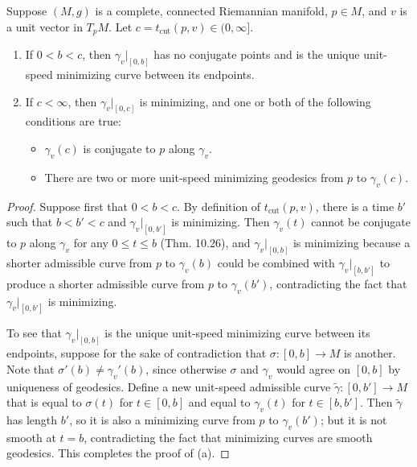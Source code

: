 \begin{proposition}
\label{prop:properties-of-cut-times}

Suppose $(M, g)$ is a complete, connected Riemannian manifold, $p \in M$, and $v$ is a unit vector in $T_p M$. Let $c = t_{\text{cut}}(p, v) \in (0, \infty]$.

\begin{enumerate}
\item[(a)] If $0 < b < c$, then $\gamma_v|_{[0,b]}$ has no conjugate points and is the unique unit-speed minimizing curve between its endpoints.

\item[(b)] If $c < \infty$, then $\gamma_v|_{[0,c]}$ is minimizing, and one or both of the following conditions are true:
\begin{itemize}
\item $\gamma_v(c)$ is conjugate to $p$ along $\gamma_v$.
\item There are two or more unit-speed minimizing geodesics from $p$ to $\gamma_v(c)$.
\end{itemize}
\end{enumerate}

\begin{proof}
Suppose first that $0 < b < c$. By definition of $t_{\text{cut}}(p, v)$, there is a time $b'$ such that $b < b' < c$ and $\gamma_v|_{[0,b']}$ is minimizing. Then $\gamma_v(t)$ cannot be conjugate to $p$ along $\gamma_v$ for any $0 \le t \le b$ (Thm. 10.26), and $\gamma_v|_{[0,b]}$ is minimizing because a shorter admissible curve from $p$ to $\gamma_v(b)$ could be combined with $\gamma_v|_{[b,b']}$ to produce a shorter admissible curve from $p$ to $\gamma_v(b')$, contradicting the fact that $\gamma_v|_{[0,b']}$ is minimizing.

To see that $\gamma_v|_{[0,b]}$ is the unique unit-speed minimizing curve between its endpoints, suppose for the sake of contradiction that $\sigma: [0, b] \to M$ is another. Note that $\sigma'(b) \ne \gamma_v'(b)$, since otherwise $\sigma$ and $\gamma_v$ would agree on $[0, b]$ by uniqueness of geodesics. Define a new unit-speed admissible curve $\tilde{\gamma}: [0, b'] \to M$ that is equal to $\sigma(t)$ for $t \in [0, b]$ and equal to $\gamma_v(t)$ for $t \in [b, b']$. Then $\tilde{\gamma}$ has length $b'$, so it is also a minimizing curve from $p$ to $\gamma_v(b')$; but it is not smooth at $t = b$, contradicting the fact that minimizing curves are smooth geodesics. This completes the proof of (a).


\end{proof}
\end{proposition}
